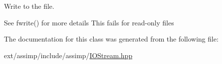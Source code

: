 Write to the file. 

See fwrite() for more details This fails for read-\/only files 

The documentation for this class was generated from the following file\-:\begin{DoxyCompactItemize}
\item 
ext/assimp/include/assimp/\hyperlink{_i_o_stream_8hpp}{I\-O\-Stream.\-hpp}\end{DoxyCompactItemize}
